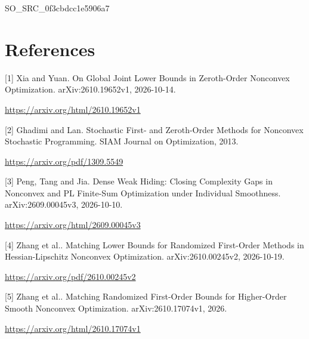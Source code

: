 \documentclass[10pt,a4paper]{article}
\begin{document}
SO\_SRC\_0f3cbdcc1e5906a7


\section{References}


[1] Xia and Yuan. On Global Joint Lower Bounds in Zeroth-Order Nonconvex Optimization. arXiv:2610.19652v1, 2026-10-14.



\url{https://arxiv.org/html/2610.19652v1}



[2] Ghadimi and Lan. Stochastic First- and Zeroth-Order Methods for Nonconvex Stochastic Programming. SIAM Journal on Optimization, 2013.



\url{https://arxiv.org/pdf/1309.5549}



[3] Peng, Tang and Jia. Dense Weak Hiding: Closing Complexity Gaps in Nonconvex and PL Finite-Sum Optimization under Individual Smoothness. arXiv:2609.00045v3, 2026-10-10.



\url{https://arxiv.org/html/2609.00045v3}



[4] Zhang et al.. Matching Lower Bounds for Randomized First-Order Methods in Hessian-Lipschitz Nonconvex Optimization. arXiv:2610.00245v2, 2026-10-19.



\url{https://arxiv.org/pdf/2610.00245v2}



[5] Zhang et al.. Matching Randomized First-Order Bounds for Higher-Order Smooth Nonconvex Optimization. arXiv:2610.17074v1, 2026.



\url{https://arxiv.org/html/2610.17074v1}
\end{document}
